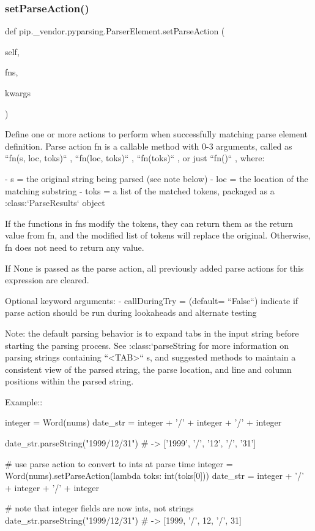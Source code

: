 \subsubsection{\texorpdfstring{set\+Parse\+Action()}{setParseAction()}}
{\footnotesize\ttfamily def pip.\+\_\+vendor.\+pyparsing.\+Parser\+Element.\+set\+Parse\+Action (\begin{DoxyParamCaption}\item[{}]{self,  }\item[{}]{fns,  }\item[{}]{kwargs }\end{DoxyParamCaption})}

\begin{DoxyVerb}Define one or more actions to perform when successfully matching parse element definition.
Parse action fn is a callable method with 0-3 arguments, called as ``fn(s, loc, toks)`` ,
``fn(loc, toks)`` , ``fn(toks)`` , or just ``fn()`` , where:

- s   = the original string being parsed (see note below)
- loc = the location of the matching substring
- toks = a list of the matched tokens, packaged as a :class:`ParseResults` object

If the functions in fns modify the tokens, they can return them as the return
value from fn, and the modified list of tokens will replace the original.
Otherwise, fn does not need to return any value.

If None is passed as the parse action, all previously added parse actions for this
expression are cleared.

Optional keyword arguments:
- callDuringTry = (default= ``False``) indicate if parse action should be run during lookaheads and alternate testing

Note: the default parsing behavior is to expand tabs in the input string
before starting the parsing process.  See :class:`parseString for more
information on parsing strings containing ``<TAB>`` s, and suggested
methods to maintain a consistent view of the parsed string, the parse
location, and line and column positions within the parsed string.

Example::

    integer = Word(nums)
    date_str = integer + '/' + integer + '/' + integer

    date_str.parseString("1999/12/31")  # -> ['1999', '/', '12', '/', '31']

    # use parse action to convert to ints at parse time
    integer = Word(nums).setParseAction(lambda toks: int(toks[0]))
    date_str = integer + '/' + integer + '/' + integer

    # note that integer fields are now ints, not strings
    date_str.parseString("1999/12/31")  # -> [1999, '/', 12, '/', 31]
\end{DoxyVerb}
